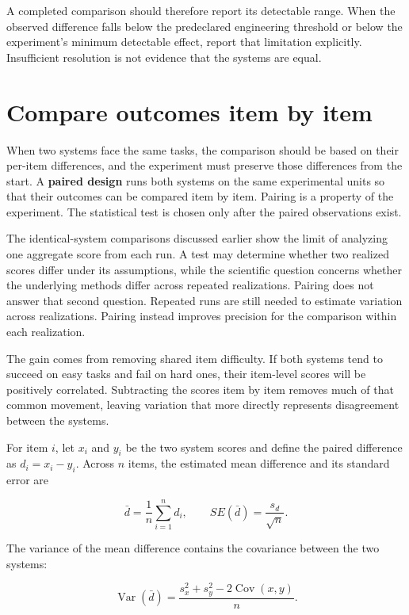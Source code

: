 A completed comparison should therefore report its detectable range. When the observed difference falls below the predeclared engineering threshold or below the experiment's minimum detectable effect, report that limitation explicitly. Insufficient resolution is not evidence that the systems are equal.

\hypertarget{compare-outcomes-item-by-item}{%
\section{Compare outcomes item by item}\label{compare-outcomes-item-by-item}}

When two systems face the same tasks, the comparison should be based on their per-item differences, and the experiment must preserve those differences from the start. A \textbf{paired design} runs both systems on the same experimental units so that their outcomes can be compared item by item. Pairing is a property of the experiment. The statistical test is chosen only after the paired observations exist.

The identical-system comparisons discussed earlier show the limit of analyzing one aggregate score from each run. A test may determine whether two realized scores differ under its assumptions, while the scientific question concerns whether the underlying methods differ across repeated realizations. Pairing does not answer that second question. Repeated runs are still needed to estimate variation across realizations. Pairing instead improves precision for the comparison within each realization.

The gain comes from removing shared item difficulty. If both systems tend to succeed on easy tasks and fail on hard ones, their item-level scores will be positively correlated. Subtracting the scores item by item removes much of that common movement, leaving variation that more directly represents disagreement between the systems.

For item \(i\), let \(x_i\) and \(y_i\) be the two system scores and define the paired difference as \(d_i=x_i-y_i\). Across \(n\) items, the estimated mean difference and its standard error are

\[
\bar d=\frac{1}{n}\sum_{i=1}^{n}d_i,
\qquad
SE(\bar d)=\frac{s_d}{\sqrt n}.
\]

The variance of the mean difference contains the covariance between the two systems:

\[
\operatorname{Var}(\bar d)
=\frac{s_x^2+s_y^2-2\operatorname{Cov}(x,y)}{n}.
\]

